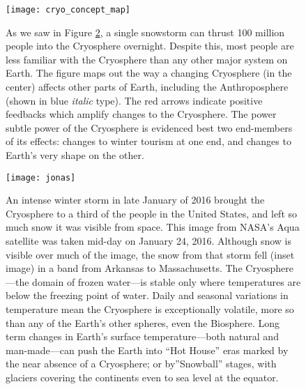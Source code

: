 \documentclass[amstex,12pt]{book}
\begin{document}
\begin{figure}[p]
\centering
\texttt{[image: cryo\_concept\_map]}%
\caption{As we saw in Figure \ref{fig:jonas}, a single snowstorm can thrust 100 million people into the Cryosphere overnight. Despite this, most people are less familiar with the Cryosphere than any other major system on Earth. The figure maps out the way a changing Cryosphere (in the center) affects other parts of Earth, including the Anthroposphere (shown in blue \textit{italic} type). The red arrows indicate positive feedbacks which amplify changes to the Cryosphere. The power subtle power of the Cryosphere is evidenced best two end-members of its effects: changes to winter tourism at one end, and changes to Earth's very shape on the other.} 
\label{fig:cryo_concept_map}
\end{figure}

\begin{figure}%
\centering
\texttt{[image: jonas]}%
\caption{An intense winter storm in late January of 2016 brought the Cryosphere to a third of the people in the United States, and left so much snow it was visible from space. This image from NASA's Aqua satellite was taken mid-day on January 24, 2016. Although snow is visible over much of the image, the snow from that storm fell (inset image) in a band from Arkansas to Massachusetts. The Cryosphere---the domain of frozen water---is stable only where temperatures are below the freezing point of water. Daily and seasonal variations in temperature mean the Cryosphere is exceptionally volatile, more so than any of the Earth's other spheres, even the Biosphere. Long term changes in Earth's surface temperature---both natural and man-made---can push the Earth into ``Hot House'' eras marked by the near absence of a Cryosphere; or by''Snowball'' stages, with glaciers covering the continents even to sea level at the equator.} 
\label{fig:jonas}
\end{figure} 
\end{document}
